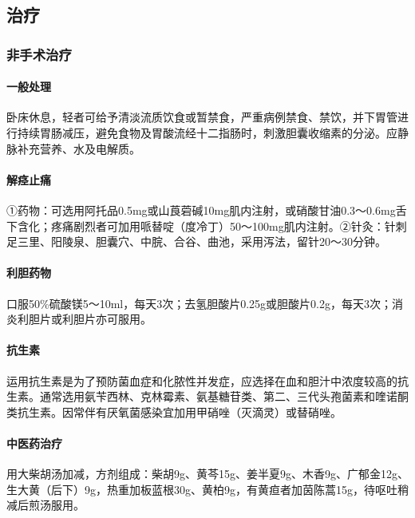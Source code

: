 \subsection{治疗}

\subsubsection{非手术治疗}

\paragraph{一般处理}

卧床休息，轻者可给予清淡流质饮食或暂禁食，严重病例禁食、禁饮，并下胃管进行持续胃肠减压，避免食物及胃酸流经十二指肠时，刺激胆囊收缩素的分泌。应静脉补充营养、水及电解质。

\paragraph{解痉止痛}

①药物：可选用阿托品0.5mg或山莨菪碱10mg肌内注射，或硝酸甘油0.3～0.6mg舌下含化；疼痛剧烈者可加用哌替啶（度冷丁）50～100mg肌内注射。②针灸：针刺足三里、阳陵泉、胆囊穴、中脘、合谷、曲池，采用泻法，留针20～30分钟。

\paragraph{利胆药物}

口服50\%硫酸镁5～10ml，每天3次；去氢胆酸片0.25g或胆酸片0.2g，每天3次；消炎利胆片或利胆片亦可服用。

\paragraph{抗生素}

运用抗生素是为了预防菌血症和化脓性并发症，应选择在血和胆汁中浓度较高的抗生素。通常选用氨苄西林、克林霉素、氨基糖苷类、第二、三代头孢菌素和喹诺酮类抗生素。因常伴有厌氧菌感染宜加用甲硝唑（灭滴灵）或替硝唑。

\paragraph{中医药治疗}

用大柴胡汤加减，方剂组成：柴胡9g、黄芩15g、姜半夏9g、木香9g、广郁金12g、生大黄（后下）9g，热重加板蓝根30g、黄柏9g，有黄疸者加茵陈蒿15g，待呕吐稍减后煎汤服用。

